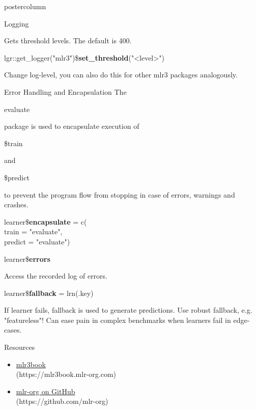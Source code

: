 \documentclass{beamer}
\newcommand{\codeinline}[1]{\begin{codeboxinline}#1\end{codeboxinline}}
\begin{document}
\begin{withoutheader}
\begin{frame}[fragile]{}
\begin{columns}
\begin{column}{.245\textwidth}
\begin{beamercolorbox}[center]{postercolumn}
\begin{minipage}{.98\textwidth}
{\begin{myblock}{Logging}
\begin{codeboxmultiline}[width=23.1cm]
							\end{codeboxmultiline}
							Gets threshold levels. The default is 400. 
							\\
							\begin{codeboxmultiline}[width=25cm]
								\footnotesize{
								lgr::get\_logger("mlr3")\$\textbf{set\_threshold}("<level>")}
							\end{codeboxmultiline}
							Change log-level, you can also do this for other mlr3 packages analogously.
						\end{myblock}
						\begin{myblock}{Error Handling and Encapsulation}
							The \codeinline{evaluate} package is used to encapsulate execution of \codeinline{\$train} and \codeinline{\$predict} to prevent the program flow from stopping in case of errors, warnings and crashes.
							\\
							\begin{codeboxmultiline}[width=16cm]
								learner\$\textbf{encapsulate} = c(\\
								\hspace*{1ex} train = "evaluate", \\
								\hspace*{1ex} predict = "evaluate")
							\end{codeboxmultiline}
							\vspace{1em}
							\begin{codebox}
								learner\$\textbf{errors}
							\end{codebox}
							Access the recorded log of errors.
							\\
							\begin{codebox}
								learner\$\textbf{fallback} = lrn(.key)
							\end{codebox}
							If learner fails, fallback is used to generate predictions. 
                            Use robust fallback, e.g. "featureless"! Can ease pain in complex benchmarks when learners fail in edge-cases.
						\end{myblock}
						\begin{myblock}{Resources}
							\begin{itemize}
								\item \href{https://mlr3book.mlr-org.com/index.html}{mlr3book}\\ (https://mlr3book.mlr-org.com)
								\item \href{https://github.com/mlr-org}{mlr-org on GitHub}\\ (https://github.com/mlr-org)

\end{itemize}
\end{myblock}}
\end{minipage}
\end{beamercolorbox}
\end{column}
\end{columns}
\end{frame}
\end{withoutheader}
\end{document}
